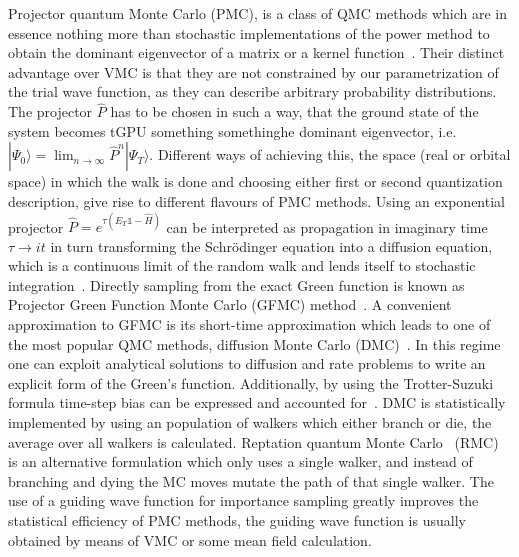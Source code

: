 \documentclass[final,3p,times,twocolumn]{elsarticle}
\begin{document}
		Projector quantum Monte Carlo (PMC), is a class of QMC methods which are in essence nothing more than stochastic implementations of the power method to obtain the dominant eigenvector of a matrix or a kernel function~\cite{gubernatis_kawashima_werner_2016}. Their distinct advantage over VMC is that they are not constrained by our parametrization of the trial wave function, as they can describe arbitrary probability distributions. The projector $\hat P$ has to be chosen in such a way, that the ground state of the system becomes tGPU something somethinghe dominant eigenvector, i.e. $| \Psi_{0}\rangle = \lim_{n\rightarrow \infty} \hat{P}^n |\Psi_{T}\rangle$. Different ways of achieving this, the space (real or orbital space) in which the walk is done and choosing either first or second quantization description, give rise to different flavours of PMC methods. Using an exponential projector $\hat{P} = e^{\tau (E_T \mathbb{1} - \hat{H})}$ can be interpreted as propagation in imaginary time $\tau \rightarrow it$ in turn transforming the Schr\"odinger equation into a diffusion equation, which is a continuous limit of the random walk and lends itself to stochastic integration~\cite{reynolds1990diffusion}. 
		Directly sampling from the exact Green function is known as Projector Green Function Monte Carlo (GFMC) method~\cite{kalos1962monte, kalos1966stochastic}. A convenient approximation to GFMC is its short-time approximation which leads to one of the most popular QMC methods, diffusion Monte Carlo (DMC)~\cite{foulkes2001quantum, reynolds1990diffusion}. In this regime one can exploit analytical solutions to diffusion and rate problems to write an explicit form of the Green's function. Additionally, by using the Trotter-Suzuki formula time-step bias can be expressed and accounted for~\cite{austin2012quantum}. DMC is statistically implemented by using an population of walkers which either branch or die, the average over all walkers is calculated. Reptation quantum Monte Carlo~\cite{reynolds1990diffusion} (RMC) is an alternative formulation which only uses a single walker, and instead of branching and dying the MC moves mutate the path of that single walker. The use of a guiding wave function for importance sampling greatly improves the statistical efficiency of PMC methods, the guiding wave function is usually obtained by means of VMC or some mean field calculation. 
		
\end{document}
